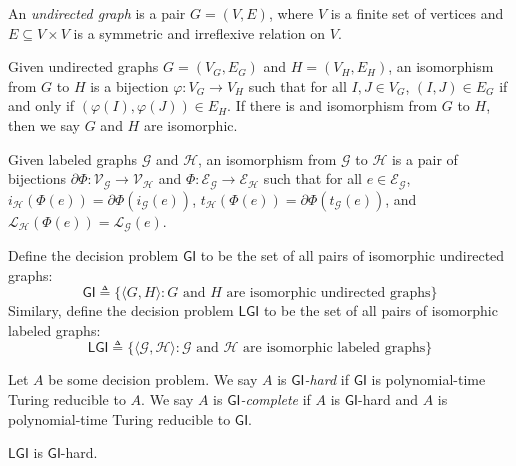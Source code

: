 \documentclass{article}
\newcommand{\Lc}{\mathcal{L}}  %
\newcommand{\Gc}{\mathcal{G}}  %
\newcommand{\Hc}{\mathcal{H}}  %
\newcommand{\Vc}{\mathcal{V}}
\newcommand{\Ec}{\mathcal{E}}
\newcommand{\term}[1]{\textit{#1}}
\newcommand{\GI}{\textsf{GI}}
\newcommand{\LGI}{\textsf{LGI}}
\theoremstyle{definition}
\begin{document}
\begin{definition}
    An \term{undirected graph} is a pair \(G = (V, E)\), where \(V\) is a 
    finite set of vertices and \(E \subseteq V \times V\) is a symmetric and irreflexive relation
    on \(V\).
\end{definition}

\begin{definition}
    Given undirected graphs \(G = (V_G, E_G)\) and \(H = (V_H, E_H)\), an isomorphism from \(G\) to \(H\)
    is a bijection \(\varphi : V_G \to V_H\) such that for all \(I, J \in V_G\), 
    \((I, J) \in E_G\) if and only if \((\varphi(I), \varphi(J)) \in E_H\). If there is 
    and isomorphism from \(G\) to \(H\), then we say \(G\) and \(H\) are isomorphic.

    Given labeled graphs \(\Gc\) and \(\Hc\), an isomorphism from \(\Gc\) to \(\Hc\) 
    is a pair of bijections \(\partial\Phi : \Vc_\Gc \to \Vc_\Hc\) and \(\Phi : \Ec_\Gc \to \Ec_\Hc\)
    such that for all \(e \in \Ec_\Gc\), \(i_\Hc(\Phi(e)) = \partial\Phi(i_\Gc(e))\), 
    \(t_\Hc(\Phi(e)) = \partial\Phi(t_\Gc(e))\), and \(\Lc_\Hc(\Phi(e)) = \Lc_\Gc(e)\).
\end{definition}

\begin{definition}
    Define the decision problem \(\GI\) to be the set of all pairs of isomorphic undirected graphs:
    \[\GI \triangleq \{ \langle G, H \rangle : G \text{ and } H \text{ are isomorphic undirected graphs} \}\]
    Similary, define the decision problem \(\LGI\) to be the set of all pairs of isomorphic labeled graphs:
    \[\LGI \triangleq \{ \langle \Gc, \Hc \rangle : \Gc \text{ and } \Hc \text{ are isomorphic labeled graphs} \}\]
\end{definition}

\begin{definition}
    Let \(A\) be some decision problem. We say \(A\) is \term{\(\GI\)-hard} if \(\GI\) is polynomial-time Turing reducible 
    to \(A\). We say \(A\) is \term{\(\GI\)-complete} if \(A\) is \(\GI\)-hard and \(A\) is polynomial-time
    Turing reducible to \(\GI\).
\end{definition}

\begin{theorem}
    \(\LGI\) is \(\GI\)-hard.
\end{theorem}
\end{document}
